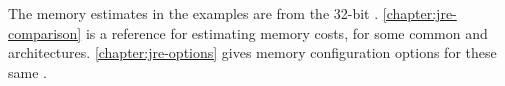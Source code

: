 The memory estimates in the examples are from the 32-bit \oracle
\javasix \jre.
\autoref{chapter:jre-comparison} is a reference for estimating memory costs,
for some common \jres and architectures.
\autoref{chapter:jre-options} gives memory configuration options for these same
\jres.





\begin{comment}
microscopic estimating (field-level counting), and accounting to predict
scale

EC diagram, bloat factory, scaling, 

lifetime: sometimes it's not a leak, just a consumption problem (in-memory
design, didn't fit)

sometimes optimizations cost: making a side object for rarely used fields; when
is it useful sharing immutable data (how much sharing before factoring it out
is worthwhile)

what java gives you, what it doesn't, some things are kinda hard to use; java
makes it hard for you

you actually have control



preface

things are hard to change at some point. it's easy to get to an irreconciliable
spot.

intro

why isn't this just for systems programmers making b-trees? this is about
everyday application development

i have GC, why care about lifetime?
i have standard data structures, why care about data model design?

data modeL: entites and relations

visual presentation of density
[flyweight: canonicalizing map]
\end{comment}